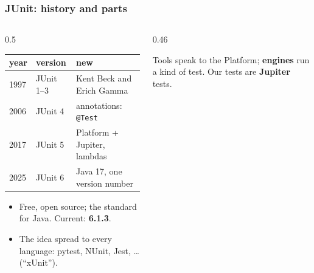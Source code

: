 \documentclass[aspectratio=169,10pt,compress]{beamer}
\begin{document}




\begin{frame}[t,fragile] \frametitle{JUnit: history and parts}
  \begin{columns}[T]
    \begin{column}{0.5\textwidth}
      \begin{center}\small
      \begin{tabular}{lll}
        \toprule
        \textbf{year} & \textbf{version} & \textbf{new} \\
        \midrule
        1997          & JUnit 1--3       & Kent Beck and Erich Gamma \\
        2006          & JUnit 4          & annotations: \texttt{@Test} \\
        2017          & JUnit 5          & Platform + Jupiter, lambdas \\
        2025          & JUnit 6          & Java 17, one version number \\
        \bottomrule
      \end{tabular}
      \end{center}
      \vspace{0.3em}
      \begin{itemize}\small
        \item Free, open source; the standard for Java. Current: \textbf{6.1.3}.
        \item The idea spread to every language: pytest, NUnit, Jest, \dots{} (``xUnit'').
      \end{itemize}
    \end{column}
    \begin{column}{0.46\textwidth}
      \begin{center}
      \end{center}
      \small Tools speak to the Platform; \textbf{engines} run a kind of test. Our tests are \textbf{Jupiter} tests.
    \end{column}
  \end{columns}
\end{frame}
\end{document}
